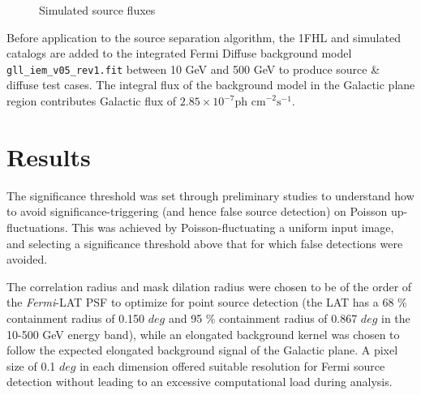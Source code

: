 \documentclass{PoS}
\begin{document}
\begin{figure}
\makeatletter
\def\@captype{table}
\makeatother
\caption{Simulated source fluxes}
\vspace{-10pt}
\end{figure}

Before application to the source separation algorithm, the 1FHL and simulated catalogs are added to the integrated Fermi Diffuse background model \verb|gll_iem_v05_rev1.fit| between 10 GeV and 500 GeV to produce source \& diffuse test cases. The integral flux of the background model in the Galactic plane region contributes Galactic flux of $2.85 \times 10^{-7} \text{ph cm}^{-2}\text{s}^{-1}$.


\section{Results}

The significance threshold was set through preliminary studies to understand how to avoid significance-triggering (and hence false source detection) on Poisson up-fluctuations. This was achieved by Poisson-fluctuating a uniform input image, and selecting a significance threshold above that for which false detections were avoided.

The correlation radius and mask dilation radius were chosen to be of the order of the \textit{Fermi}-LAT PSF to optimize for point source detection (the LAT has a 68 \% containment radius of 0.150 $deg$ and 95 \% containment radius of 0.867 $deg$ in the 10-500 GeV energy band), while an elongated background kernel was chosen to follow the expected elongated background signal of the Galactic plane. A pixel size of 0.1 $deg$ in each dimension offered suitable resolution for Fermi source detection without leading to an excessive computational load during analysis.
\end{document}
